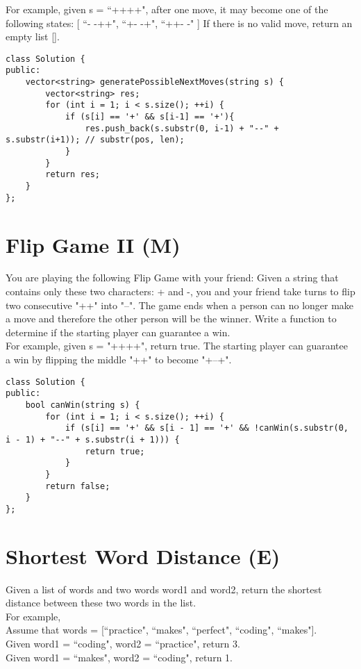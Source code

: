 For example, given s = ``++++", after one move, it may become one of the following states:
[
  ``- -++",
  ``+- -+",
  ``++- -"
]
If there is no valid move, return an empty list [].\\

\begin{lstlisting}
class Solution {
public:
    vector<string> generatePossibleNextMoves(string s) {
        vector<string> res;
        for (int i = 1; i < s.size(); ++i) {
            if (s[i] == '+' && s[i-1] == '+'){
                res.push_back(s.substr(0, i-1) + "--" + s.substr(i+1)); // substr(pos, len);
            }
        }
        return res;
    }
};
\end{lstlisting}


\section{Flip Game II (M)}
You are playing the following Flip Game with your friend: Given a string that contains only these two characters: + and -, you and your friend take turns to flip two consecutive "++" into "--". The game ends when a person can no longer make a move and therefore the other person will be the winner. Write a function to determine if the starting player can guarantee a win.\\

For example, given s = "++++", return true. The starting player can guarantee a win by flipping the middle "++" to become "+--+".\\

\begin{lstlisting}
class Solution {
public:
    bool canWin(string s) {
        for (int i = 1; i < s.size(); ++i) {
            if (s[i] == '+' && s[i - 1] == '+' && !canWin(s.substr(0, i - 1) + "--" + s.substr(i + 1))) {
                return true;
            }
        }
        return false;
    }
};
\end{lstlisting}


\section{Shortest Word Distance (E)}
Given a list of words and two words word1 and word2, return the shortest distance between these two words in the list.\\

For example,\\
Assume that words = [``practice", ``makes", ``perfect", ``coding", ``makes"].\\
Given word1 = ``coding", word2 = ``practice", return 3.\\
Given word1 = ``makes", word2 = ``coding", return 1.\\

